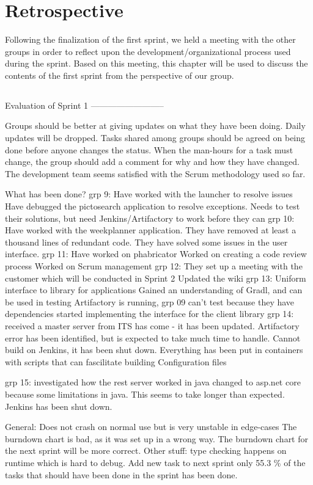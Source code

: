 \chapter{Retrospective}
Following the finalization of the first sprint, we held a meeting with the other
groups in order to reflect upon the development/organizational process used
during the sprint. Based on this meeting, this chapter will be used to discuss
the contents of the first sprint from the perspective of our group.

\section{}




Evaluation of Sprint 1
--------------------------


Groups should be better at giving updates on what they have been doing.
Daily updates will be dropped.
Tasks shared among groups should be agreed on being done before anyone changes the status.
When the man-hours for a task must change, the group should add a comment for why and how they have changed.
The development team seems satisfied with the Scrum methodology used so far.

What has been done?
grp 9:
Have worked with the launcher to resolve issues
Have debugged the pictosearch application to resolve exceptions.
Needs to test their solutions, but need Jenkins/Artifactory to work before they can
grp 10:
Have worked with the weekplanner application.
They have removed at least a thousand lines of redundant code.
They have solved some issues in the user interface.
grp 11:
Have worked on phabricator
Worked on creating a code review process
Worked on Scrum management
grp 12:
They set up a meeting with the customer which will be conducted in Sprint 2
Updated the wiki
grp 13:
Uniform interface to library for applications
Gained an understanding of Gradl, and can be used in testing
Artifactory is running, grp 09 can’t test because they have dependencies
started implementing the interface for the client library
grp 14:
received a master server from ITS has come - it has been updated.
Artifactory error has been identified, but is expected to take much time to handle.
Cannot build on Jenkins, it has been shut down.
Everything has been put in containers with scripts that can fascilitate building
Configuration files


grp 15:
investigated how the rest server worked in java
changed to asp.net core because some limitations in java. This seems to take longer than expected.
Jenkins has been shut down.

General:
Does not crash on normal use but is very unstable in edge-cases
The burndown chart is bad, as it was set up in a wrong way. The burndown chart for the next sprint will be more correct.
Other stuff:
type checking happens on runtime which is hard to debug.
Add new task to next sprint
only 55.3 \% of the tasks that should have been done in the sprint has been
done.

